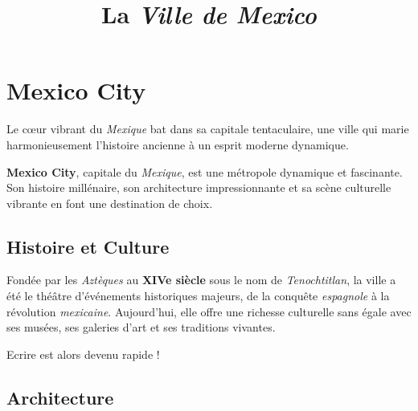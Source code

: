 \documentclass[12pt, a4paper]{article}
\title{La \textit{Ville de Mexico}}
\author{}
\date{}
\begin{document}
\maketitle

\section{\textbf{Mexico City}}

Le cœur vibrant du \textit{Mexique} bat dans sa capitale tentaculaire, une ville qui marie harmonieusement l'histoire ancienne à un esprit moderne dynamique.

\textbf{Mexico City}, capitale du \textit{Mexique}, est une métropole dynamique et fascinante. Son histoire millénaire, son architecture impressionnante et sa scène culturelle vibrante en font une destination de choix.

\subsection*{\textbf{Histoire et Culture}}

Fondée par les \textit{Aztèques} au \textbf{XIVe siècle} sous le nom de \textit{Tenochtitlan}, la ville a été le théâtre d'événements historiques majeurs, de la conquête \textit{espagnole} à la révolution \textit{mexicaine}. Aujourd'hui, elle offre une richesse culturelle sans égale avec ses musées, ses galeries d'art et ses traditions vivantes.

Ecrire est alors devenu rapide !

\subsection*{\textbf{Architecture}}
\end{document}

